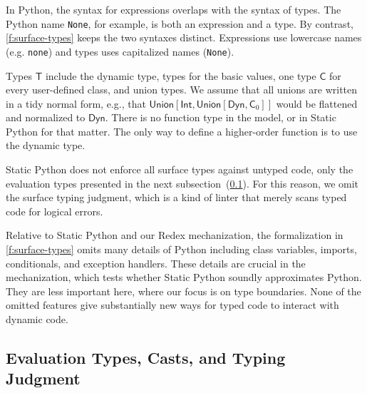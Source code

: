 \documentclass[english,cleveref,submission]{programming}
\newcommand{\SP}{Static Python}
\newcommand{\code}[1]{\texttt{#1}}
\newcommand{\typefont}[1]{\mathsf{#1}}
\newcommand{\paramtype}[2]{#1[#2]}
\newcommand{\sptype}{\typefont{T}}
\newcommand{\sptclass}{\typefont{C}}
\newcommand{\sptint}{\typefont{Int}}
\newcommand{\sptdyn}{\typefont{Dyn}}
\newcommand{\sptunion}[1]{\paramtype{\typefont{Union}}{#1}}
\begin{document}
In Python, the syntax for expressions overlaps with the syntax of types.
The Python name \code{None}, for example, is both an expression and a type.
By contrast, \cref{f:surface-types} keeps the two syntaxes distinct.
Expressions use lowercase names (e.g. \code{none}) and types uses capitalized
names (\code{None}).

Types $\sptype$ include the dynamic type, types for the basic values, one type $\sptclass$ for every
user-defined class, and union types.
We assume that all unions are written in a tidy normal form, e.g., that
$\sptunion{\sptint, \sptunion{\sptdyn, \sptclass_0}}$ would be flattened and normalized to $\sptdyn$.
There is no function type in the model, or in \SP{} for that matter.
The only way to define a higher-order function is to use the dynamic type.

\SP{} does not enforce all surface types against untyped code, only the evaluation
types presented in the next subsection~(\cref{s:eval-types}).
For this reason, we omit the surface typing judgment, which is a kind of linter
that merely scans typed code for logical errors.

Relative to \SP{} and our Redex mechanization, the formalization in \cref{f:surface-types} omits
many details of Python including class variables, imports, conditionals, and exception handlers.
These details are crucial in the mechanization, which tests whether \SP{}
soundly approximates Python.
They are less important here, where our focus is on type boundaries.
None of the omitted features give substantially new ways for typed code to interact with dynamic code.


\subsection{Evaluation Types, Casts, and Typing Judgment}
\label{s:eval-types}
\end{document}
